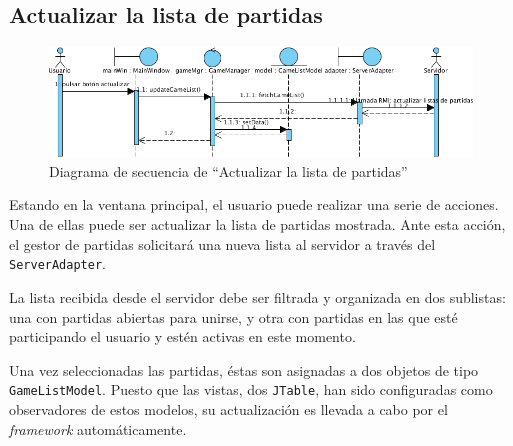 \subsection{Actualizar la lista de partidas}

\begin{figure}[ht]
\centering
\includegraphics[scale=0.6]{img/ch03devel-listgames.png}
\caption{Diagrama de secuencia de ``Actualizar la lista de partidas''}
\end{figure}

Estando en la ventana principal, el usuario puede realizar una serie de
acciones. Una de ellas puede ser actualizar la lista de partidas mostrada. Ante
esta acción, el gestor de partidas solicitará una nueva lista al servidor a
través del \texttt{ServerAdapter}.

La lista recibida desde el servidor debe ser filtrada y organizada en dos
sublistas: una con partidas abiertas para unirse, y otra con partidas en las
que esté participando el usuario y estén activas en este momento.

Una vez seleccionadas las partidas, éstas son asignadas a dos objetos de tipo
\texttt{GameListModel}. Puesto que las vistas, dos \texttt{JTable}, han sido
configuradas como observadores de estos modelos, su actualización es llevada a
cabo por el \textit{framework} automáticamente.
